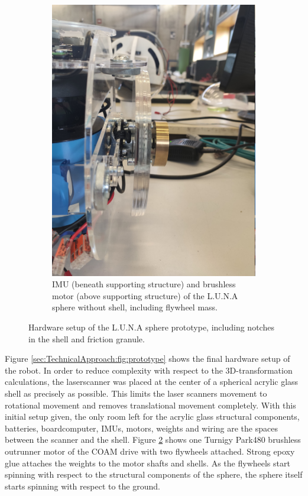 \begin{figure}
\begin{subfigure}[b]{0.34\textwidth}
        \includegraphics[width=\textwidth]{../Media/sphereRightMotor.jpg}
        \caption{IMU (beneath supporting structure) and brushless motor (above supporting structure) of the L.U.N.A sphere without shell, including flywheel mass. }
        \label{sec:TechnicalApproach:fig:motor}
\end{subfigure}
\caption{Hardware setup of the L.U.N.A sphere prototype, including notches in the shell and friction granule.}
\end{figure}

Figure \ref{sec:TechnicalApproach:fig:prototype} shows the final hardware setup of the robot. In order to reduce complexity with respect to the 3D-transformation calculations, the laserscanner was placed at the center of a spherical acrylic glass shell as precisely as possible. This limits the laser scanners movement to rotational movement and removes translational movement completely. With this initial setup given, the only room left for the acrylic glass structural components, batteries, boardcomputer, IMUs, motors, weights and wiring are the spaces between the scanner and the shell. Figure \ref{sec:TechnicalApproach:fig:motor} shows one Turnigy Park480 brushless outrunner motor \cite{turnigymotor} of the COAM drive with two flywheels attached. Strong epoxy glue attaches the weights to the motor shafts and shells. As the flywheels start spinning with respect to the structural components of the sphere, the sphere itself starts spinning with respect to the ground. 

